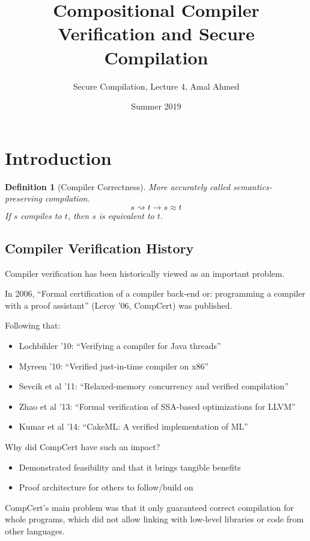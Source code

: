 \documentclass[11pt]{article}
\title{Compositional Compiler Verification and Secure Compilation}
\author{Secure Compilation, Lecture 4, Amal Ahmed}
\date{Summer 2019}
\newcommand{\compile}{\rightsquigarrow}
\newcommand{\imp}{\ensuremath{\longrightarrow}}
\newtheorem{defn}{Definition}[section]
\begin{document}
\maketitle

\section{Introduction}

\begin{defn}[Compiler Correctness]
  More accurately called semantics-preserving compilation.
  \[s \compile t  \imp  s \approx t\]
  If $s$ compiles to $t$, then $s$ is equivalent to $t$.
\end{defn}

\subsection{Compiler Verification History}

Compiler verification has been historically viewed as an important problem.

In 2006, ``Formal certification of a compiler back-end or: programming
a compiler with a proof assistant'' (Leroy '06, CompCert) was
published.

Following that:
\begin{itemize}
\item Lochbihler '10:  ``Verifying a compiler for Java threads''
\item Myreen '10:  ``Verified just-in-time compiler on x86''
\item Sevcik et al '11:  ``Relaxed-memory concurrency and verified compilation''
\item Zhao et al '13:  ``Formal verification of SSA-based optimizations for LLVM''
\item Kumar et al '14:  ``CakeML:  A verified implementation of ML''
\end{itemize}

Why did CompCert have such an impact?
\begin{itemize}
\item Demonstrated feasibility and that it brings tangible benefits
\item Proof architecture for others to follow/build on
\end{itemize}

CompCert's main problem was that it only guaranteed correct
compilation for whole programs, which did not allow linking with
low-level libraries or code from other languages.
\end{document}
